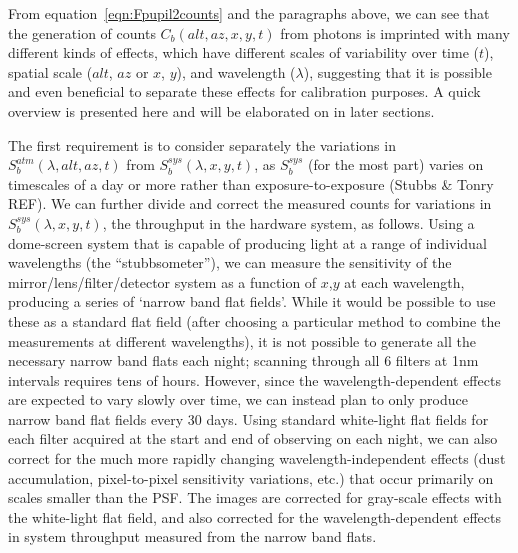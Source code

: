 \documentclass[12pt,preprint]{aastex}
\begin{document}
From equation~\ref{eqn:Fpupil2counts} and the paragraphs above, we can see
that the generation of counts $C_b(alt,az,x,y,t)$ from photons is
imprinted with many different kinds of effects, which have different
scales of variability over time ($t$), spatial scale ($alt$, $az$ or
$x$, $y$), and wavelength ($\lambda$), suggesting that it is possible
and even beneficial to separate these effects for calibration
purposes. A quick overview is presented here and will be elaborated on
in later sections.

The first requirement is to consider separately the variations in
$S_b^{atm}(\lambda,alt,az,t)$ from $S_b^{sys}(\lambda,x,y,t)$, as
$S_b^{sys}$ (for the most part) varies on timescales of a day or more rather than
exposure-to-exposure (Stubbs \& Tonry REF). We can further divide and
correct the measured counts for variations in
$S_b^{sys}(\lambda,x,y,t)$, the throughput in the hardware system, as
follows. Using a dome-screen system that is capable of producing light
at a range of individual wavelengths (the ``stubbsometer''), we can
measure the sensitivity of the mirror/lens/filter/detector system as a
function of $x$,$y$ at each wavelength, producing a series of
`narrow band flat fields'. While it would be possible to use these
as a standard flat field (after choosing a particular method to
combine the measurements at different wavelengths), it is not possible
to generate all the necessary narrow band flats each night; scanning
through all 6 filters at 1nm intervals requires tens of
hours. However, since the wavelength-dependent effects are expected to
vary slowly over time, we can instead plan to only produce
narrow band flat fields every 30 days. Using standard white-light
flat fields for each filter acquired at the start and end of observing
on each night, we can also correct for the much more rapidly changing
wavelength-independent effects (dust accumulation, pixel-to-pixel
sensitivity variations, etc.) that occur primarily on scales smaller
than the PSF. The images are corrected for gray-scale effects with the white-light flat
field, and also corrected for the wavelength-dependent effects in
system throughput measured from the narrow band flats.
\end{document}
